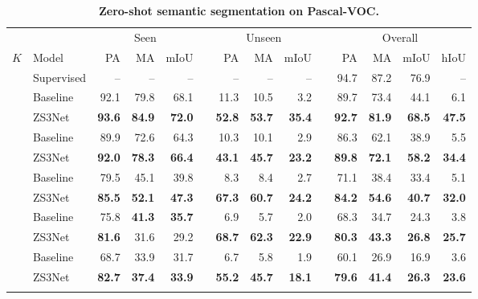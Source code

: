 \documentclass{article}
\begin{document}
\begin{table} 
\caption{\small \textbf{Zero-shot semantic segmentation on Pascal-VOC.\vspace{3pt}}}
\small{
\begin{tabular}{clrrrrrrrrrrrr}  \toprule
 & & \multicolumn{3}{c}{Seen}  && \multicolumn{3}{c}{Unseen} && \multicolumn{4}{c}{Overall} \\ \cline{3-5} \cline{7-9} \cline{11-14} \noalign{\smallskip}
 $K$ &  Model  &  PA    &  MA    &  mIoU  &&  PA    &  MA  &  mIoU   &&  PA    &  MA & mIoU  & hIoU \\ \midrule[1.1pt]
 & Supervised & -- & --  & -- && -- & -- & -- && 94.7  & 87.2 & 76.9 & -- \\ \hline\noalign{\smallskip}
 \multirow{3}{*}{2} & Baseline  & 92.1 & 79.8  & 68.1  && 11.3 & 10.5 & 3.2 && 89.7  & 73.4 & 44.1 & 6.1 \\ 
                    & ZS3Net    & \bf 93.6 &  \bf 84.9  & \bf 72.0  && \bf 52.8 & \bf 53.7  & \bf 35.4 && \bf 92.7 & \bf 81.9 & \bf 68.5  & \bf 47.5 \\ \hline\noalign{\smallskip}
 \multirow{3}{*}{4} & Baseline  & 89.9 & 72.6  & 64.3 && 10.3  & 10.1  & 2.9  && 86.3  & 62.1 & 38.9 & 5.5\\ 
                    & ZS3Net    & \bf 92.0 & \bf  78.3 & \bf 66.4  && \bf 43.1 &  \bf 45.7 & \bf 23.2 &&  \bf 89.8 & \bf 72.1  & \bf 58.2 & \bf 34.4  \\ \hline\noalign{\smallskip}
 \multirow{3}{*}{6} & Baseline  & 79.5 & 45.1  & 39.8 && 8.3 & 8.4 & 2.7 && 71.1 & 38.4 & 33.4 &  5.1\\ 
                    & ZS3Net     & \bf 85.5 & \bf  52.1  & \bf  47.3 && \bf 67.3  & \bf 60.7  &\bf  24.2 && \bf 84.2 & \bf 54.6 & \bf 40.7   & \bf 32.0 \\ \hline\noalign{\smallskip}
 \multirow{3}{*}{8} & Baseline  & 75.8 & \bf 41.3  & \bf 35.7 && 6.9  & 5.7 & 2.0 &&  68.3 & 34.7 &   24.3 & 3.8\\ 
                    & ZS3Net     & \bf 81.6 &   31.6 &  29.2  && \bf 68.7  & \bf  62.3 & \bf 22.9 && \bf 80.3 & \bf 43.3 & \bf 26.8 & \bf 25.7  \\ \hline\noalign{\smallskip}
 \multirow{3}{*}{10}& Baseline  & 68.7 & 33.9  & 31.7  && 6.7 & 5.8 & 1.9  && 60.1  & 26.9 & 16.9 & 3.6\\ 
                     & ZS3Net     & \bf 82.7  &  \bf 37.4 & \bf 33.9 && \bf 55.2 & \bf  45.7 & \bf 18.1  && \bf 79.6 & \bf 41.4 & \bf 26.3  & \bf 23.6  \\ \bottomrule 
\vspace{-0.5cm}
\end{tabular}
}
\label{pascalvoc_res}
\end{table}
\end{document}
